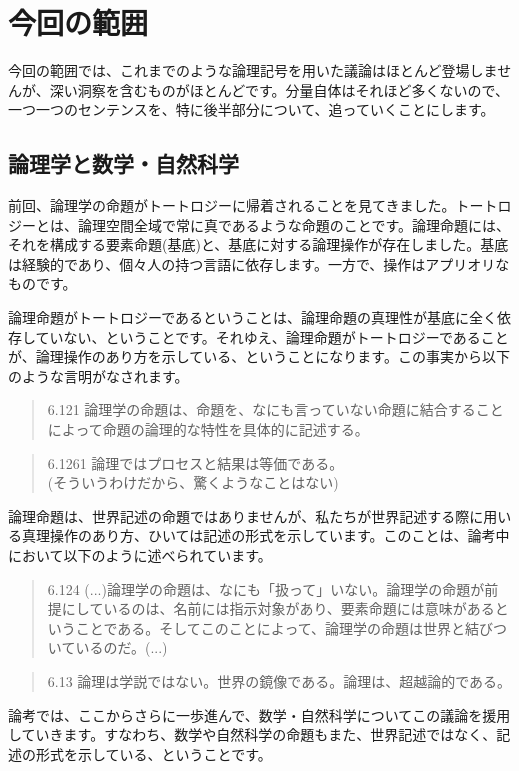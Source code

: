 \documentclass[12pt]{jsarticle}
\begin{document}
\section{今回の範囲}
今回の範囲では、これまでのような論理記号を用いた議論はほとんど登場しませんが、深い洞察を含むものがほとんどです。分量自体はそれほど多くないので、一つ一つのセンテンスを、特に後半部分について、追っていくことにします。

\subsection{論理学と数学・自然科学}
前回、論理学の命題がトートロジーに帰着されることを見てきました。トートロジーとは、論理空間全域で常に真であるような命題のことです。論理命題には、それを構成する要素命題(基底)と、基底に対する論理操作が存在しました。基底は経験的であり、個々人の持つ言語に依存します。一方で、操作はアプリオリなものです。
\par
論理命題がトートロジーであるということは、論理命題の真理性が基底に全く依存していない、ということです。それゆえ、論理命題がトートロジーであることが、論理操作のあり方を示している、ということになります。この事実から以下のような言明がなされます。
\begin{quote}
6.121 論理学の命題は、命題を、なにも言っていない命題に結合することによって命題の論理的な特性を具体的に記述する。
\end{quote}
\begin{quote}
6.1261 論理ではプロセスと結果は等価である。\\(そういうわけだから、驚くようなことはない)
\end{quote}
\par
論理命題は、世界記述の命題ではありませんが、私たちが世界記述する際に用いる真理操作のあり方、ひいては記述の形式を示しています。このことは、論考中において以下のように述べられています。
\begin{quote}
6.124 (...)論理学の命題は、なにも「扱って」いない。論理学の命題が前提にしているのは、名前には指示対象があり、要素命題には意味があるということである。そしてこのことによって、論理学の命題は世界と結びついているのだ。(...)
\end{quote}
\begin{quote}
6.13 論理は学説ではない。世界の鏡像である。論理は、超越論的である。
\end{quote}
\par
論考では、ここからさらに一歩進んで、数学・自然科学についてこの議論を援用していきます。すなわち、数学や自然科学の命題もまた、世界記述ではなく、記述の形式を示している、ということです。
\end{document}

